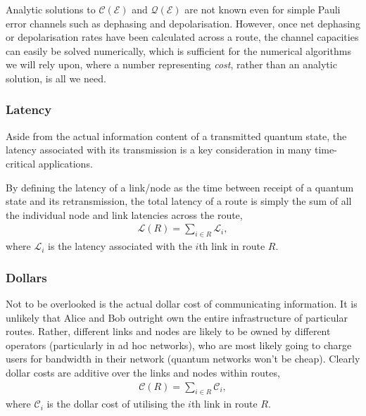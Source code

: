 Analytic solutions to $\mathcal{C}(\mathcal{E})$ and $\mathcal{Q}(\mathcal{E})$ are not known even for simple Pauli error channels such as dephasing and depolarisation. However, once net dephasing or depolarisation rates have been calculated across a route, the channel capacities can easily be solved numerically, which is sufficient for the numerical algorithms we will rely upon, where a number representing \textit{cost}, rather than an analytic solution, is all we need.


%
%

\subsubsection{Latency} \label{sec:latency_metric} 

Aside from the actual information content of a transmitted quantum state, the latency associated with its transmission is a key consideration in many time-critical applications.

By defining the latency of a link/node as the time between receipt of a quantum state and its retransmission, the total latency of a route is simply the sum of all the individual node and link latencies across the route,
\begin{align}
\mathcal{L}(R) = \sum_{i\in R} \mathcal{L}_i,
\end{align}
where $\mathcal{L}_i$ is the latency associated with the $i$th link in route $R$.

%
%

\subsubsection{Dollars} \label{sec:dollars} 

Not to be overlooked is the actual dollar cost of communicating information. It is unlikely that Alice and Bob outright own the entire infrastructure of particular routes. Rather, different links and nodes are likely to be owned by different operators (particularly in ad hoc networks), who are most likely going to charge users for bandwidth in their network (quantum networks won't be cheap). Clearly dollar costs are additive over the links and nodes within routes,
\begin{align}
\mathcal{C}(R) = \sum_{i\in R} \mathcal{C}_i,
\end{align}
where $\mathcal{C}_i$ is the dollar cost of utilising the $i$th link in route $R$.

